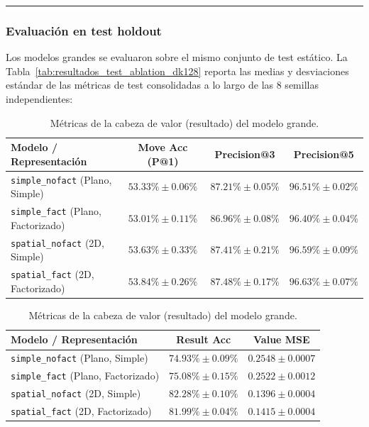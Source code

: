 \documentclass[12pt, a4paper]{article}
\begin{document}
\rule{\textwidth}{0.2pt}
\subsubsection{Evaluación en test holdout}

Los modelos grandes se evaluaron sobre el mismo conjunto de test estático. La Tabla~\ref{tab:resultados_test_ablation_dk128} reporta las medias y desviaciones estándar de las métricas de test consolidadas a lo largo de las 8 semillas independientes:

\begin{table}[htbp]
    \centering
    \small
    \begin{subtable}{\textwidth}
        \centering
        \setlength{\tabcolsep}{6pt}
        \begin{tabular}{|l|c|c|c|}
        \hline
        \textbf{Modelo / Representación} & \textbf{Move Acc (P@1)} & \textbf{Precision@3} & \textbf{Precision@5} \\
        \hline
        \texttt{simple\_nofact} (Plano, Simple) & $53.33\% \pm 0.06\%$ & $87.21\% \pm 0.05\%$ & $96.51\% \pm 0.02\%$ \\
        \texttt{simple\_fact} (Plano, Factorizado) & $53.01\% \pm 0.11\%$ & $86.96\% \pm 0.08\%$ & $96.40\% \pm 0.04\%$ \\
        \texttt{spatial\_nofact} (2D, Simple) & $53.63\% \pm 0.33\%$ & $87.41\% \pm 0.21\%$ & $96.59\% \pm 0.09\%$ \\
        \texttt{spatial\_fact} (2D, Factorizado) & $\mathbf{53.84}\% \pm 0.26\%$ & $\mathbf{87.48}\% \pm 0.17\%$ & $\mathbf{96.63}\% \pm 0.07\%$ \\
        \hline
        \end{tabular}
        \caption{Métricas de la cabeza de política (movimientos) del modelo grande.}
        \label{subtab:politica_dk128}
    \end{subtable}
    
    \vspace{0.4cm}
    
    \begin{subtable}{\textwidth}
        \centering
        \setlength{\tabcolsep}{6pt}
        \begin{tabular}{|l|c|c|}
        \hline
        \textbf{Modelo / Representación} & \textbf{Result Acc} & \textbf{Value MSE} \\
        \hline
        \texttt{simple\_nofact} (Plano, Simple) & $74.93\% \pm 0.09\%$ & $0.2548 \pm 0.0007$ \\
        \texttt{simple\_fact} (Plano, Factorizado) & $75.08\% \pm 0.15\%$ & $0.2522 \pm 0.0012$ \\
        \texttt{spatial\_nofact} (2D, Simple) & $\mathbf{82.28}\% \pm 0.10\%$ & $\mathbf{0.1396} \pm 0.0004$ \\
        \texttt{spatial\_fact} (2D, Factorizado) & $81.99\% \pm 0.04\%$ & $0.1415 \pm 0.0004$ \\
        \hline
        \end{tabular}
        \caption{Métricas de la cabeza de valor (resultado) del modelo grande.}
        \label{subtab:valor_dk128}
    \end{subtable}
    

\end{table}
\end{document}
